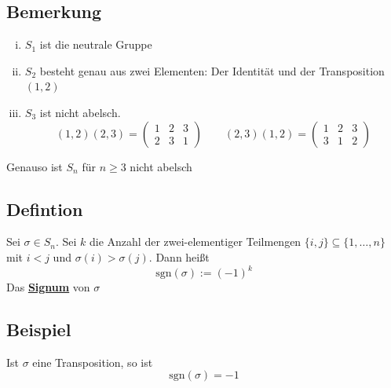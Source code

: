 \subsection{Bemerkung} %
\label{sub:bemerkung}
\begin{enumerate}[(i)]
	\item $S_1$ ist die neutrale Gruppe
	\item $S_2$ besteht genau aus zwei Elementen: Der Identität und der Transposition $(1,2)$
	\item $S_3$ ist nicht abelsch. 
	\[
		(1,2)(2,3)= \begin{pmatrix}
				1 & 2 & 3 \\
				2 & 3 & 1
			\end{pmatrix} 
		\qquad (2,3)(1,2)= \begin{pmatrix}
			1 & 2 & 3 \\
			3 & 1 & 2
		\end{pmatrix}
	\]
	
\end{enumerate}
Genauso ist $S_n$ für $n \ge 3$ nicht abelsch

\subsection{Defintion} %
\label{sub:defintion}
Sei $\sigma \in S_n$. Sei $k$ die Anzahl der zwei-elementiger Teilmengen $\{ i,j\} \subseteq \{ 1, \ldots , n \}$ mit $i <j$ und $\sigma(i)> \sigma(j)$.
Dann heißt 
\[
	\text{sgn}(\sigma) := (-1)^k
\]
Das \underline{\textbf{Signum}} von $\sigma$

\subsection{Beispiel} %
\label{sub:beispiel}
Ist $\sigma$ eine Transposition, so ist
\[
	\text{sgn}(\sigma) = -1
\]

